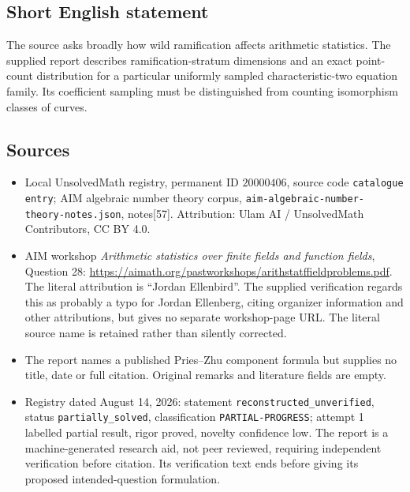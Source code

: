 \documentclass[11pt]{article}
\begin{document}
\subsection{Short English statement}
The source asks broadly how wild ramification affects arithmetic statistics. The supplied report describes ramification-stratum dimensions and an exact point-count distribution for a particular uniformly sampled characteristic-two equation family. Its coefficient sampling must be distinguished from counting isomorphism classes of curves.
\subsection{Sources}
\begin{itemize}
\item Local UnsolvedMath registry, permanent ID \(20000406\), source code \texttt{catalogue entry}; AIM algebraic number theory corpus, \texttt{aim-algebraic-number-theory-notes.json}, notes[57]. Attribution: Ulam AI / UnsolvedMath Contributors, CC BY 4.0.
\item AIM workshop \emph{Arithmetic statistics over finite fields and function fields}, Question 28: \url{https://aimath.org/pastworkshops/arithstatffieldproblems.pdf}. The literal attribution is ``Jordan Ellenbird''. The supplied verification regards this as probably a typo for Jordan Ellenberg, citing organizer information and other attributions, but gives no separate workshop-page URL. The literal source name is retained rather than silently corrected.
\item The report names a published Pries--Zhu component formula but supplies no title, date or full citation. Original remarks and literature fields are empty.
\item Registry dated August 14, 2026: statement \texttt{reconstructed\_unverified}, status \texttt{partially\_solved}, classification \texttt{PARTIAL-PROGRESS}; attempt 1 labelled partial result, rigor proved, novelty confidence low. The report is a machine-generated research aid, not peer reviewed, requiring independent verification before citation. Its verification text ends before giving its proposed intended-question formulation.
\end{itemize}
\end{document}
